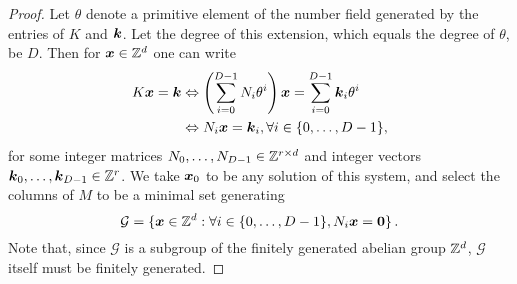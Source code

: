 \begin{proof}
  Let $\theta$ denote a primitive element of the number field
  generated by the entries of $K$ and $\boldsymbol{k}$. Let the degree of this extension, which equals the degree of $\theta$, be $D$. Then for $\boldsymbol{x} \in \mathbb{Z}^{d}$ one can write
\begin{align*}
K \boldsymbol{x} = \boldsymbol{k} &\Leftrightarrow \left( \sum \limits_{i=0}^{D-1} N_{i} \theta^{i} \right) \boldsymbol{x} = \sum \limits_{i=0}^{D-1} \boldsymbol{k}_{i} \theta^{i} \\
&\Leftrightarrow N_{i} \boldsymbol{x} = \boldsymbol{k}_{i}, \forall i \in \lbrace 0, \ldots, D-1 \rbrace ,
\end{align*}
for some integer matrices $N_{0}, \ldots, N_{D-1} \in \mathbb{Z}^{r \times d}$ and integer vectors $\boldsymbol{k}_{0}, \ldots, \boldsymbol{k}_{D-1} \in \mathbb{Z}^{r}$.
We take $\boldsymbol{x}_{0}$ to be any solution of this system, and select the columns of $M$ to be a minimal set generating
\begin{equation*}
\mathcal{G} = \lbrace \boldsymbol{x} \in \mathbb{Z}^{d} : \forall i \in \lbrace 0, \ldots, D-1 \rbrace, N_{i} \boldsymbol{x} = \boldsymbol{0} \rbrace \, .
\end{equation*}
Note that, since $\mathcal{G}$ is a subgroup of the finitely generated abelian group $\mathbb{Z}^{d}$, $\mathcal{G}$ itself must be finitely generated.
\end{proof}
